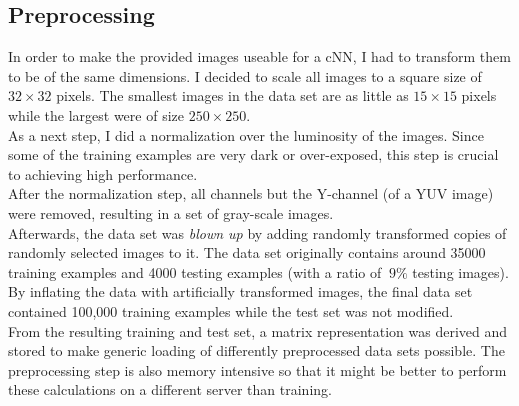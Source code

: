 \documentclass[11pt,a4paper]{article}
\begin{document}
\subsection{Preprocessing}
In order to make the provided images useable for a cNN, I had to transform them to be of the same dimensions. I decided to scale all images to a square size of $32 \times 32$ pixels. The smallest images in the data set are as little as $15 \times 15$ pixels while the largest were of size $250 \times 250$.\\
As a next step, I did a normalization over the luminosity of the images. Since some of the training examples are very dark or over-exposed, this step is crucial to achieving high performance.\\
After the normalization step, all channels but the Y-channel (of a YUV image) were removed, resulting in a set of gray-scale images.\\
Afterwards, the data set was \textit{blown up} by adding randomly transformed copies of randomly selected images to it. The data set originally contains around 35000 training examples and 4000 testing examples (with a ratio of $~9\%$ testing images). By inflating the data with artificially transformed images, the final data set contained 100,000 training examples while the test set was not modified.\\
From the resulting training and test set, a matrix representation was derived and stored to make generic loading of differently preprocessed data sets possible. The preprocessing step is also memory intensive so that it might be better to perform these calculations on a different server than training.
\end{document}
